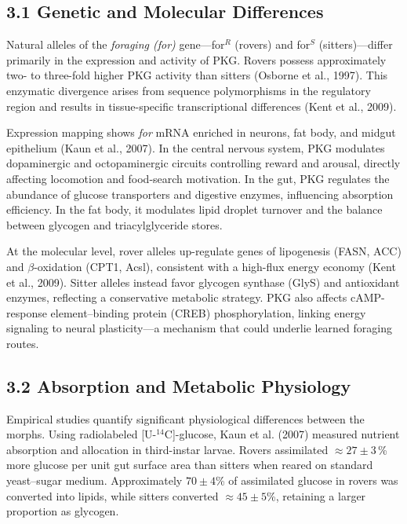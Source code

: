 \documentclass[11pt]{article}
\begin{document}
\subsection*{3.1 Genetic and Molecular Differences}

Natural alleles of the \emph{foraging (for)} gene---for$^R$ (rovers) and for$^S$ (sitters)---differ primarily in the expression and activity of PKG. Rovers possess approximately two- to three-fold higher PKG activity than sitters (Osborne et al., 1997). This enzymatic divergence arises from sequence polymorphisms in the regulatory region and results in tissue-specific transcriptional differences (Kent et al., 2009).

Expression mapping shows \emph{for} mRNA enriched in neurons, fat body, and midgut epithelium (Kaun et al., 2007). In the central nervous system, PKG modulates dopaminergic and octopaminergic circuits controlling reward and arousal, directly affecting locomotion and food-search motivation. In the gut, PKG regulates the abundance of glucose transporters and digestive enzymes, influencing absorption efficiency. In the fat body, it modulates lipid droplet turnover and the balance between glycogen and triacylglyceride stores.

At the molecular level, rover alleles up-regulate genes of lipogenesis (FASN, ACC) and $\beta$-oxidation (CPT1, Acsl), consistent with a high-flux energy economy (Kent et al., 2009). Sitter alleles instead favor glycogen synthase (GlyS) and antioxidant enzymes, reflecting a conservative metabolic strategy. PKG also affects cAMP-response element--binding protein (CREB) phosphorylation, linking energy signaling to neural plasticity---a mechanism that could underlie learned foraging routes.

\subsection*{3.2 Absorption and Metabolic Physiology}

Empirical studies quantify significant physiological differences between the morphs. Using radiolabeled [U-$^{14}$C]-glucose, Kaun et al. (2007) measured nutrient absorption and allocation in third-instar larvae. Rovers assimilated $\approx 27 \pm 3$\,\% more glucose per unit gut surface area than sitters when reared on standard yeast--sugar medium. Approximately $70 \pm 4$\% of assimilated glucose in rovers was converted into lipids, while sitters converted $\approx 45 \pm 5$\%, retaining a larger proportion as glycogen.
\end{document}
